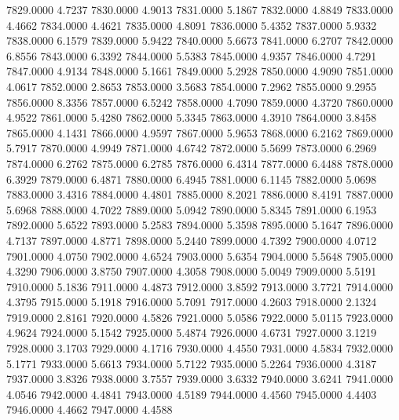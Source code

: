 7829.0000      4.7237
7830.0000      4.9013
7831.0000      5.1867
7832.0000      4.8849
7833.0000      4.4662
7834.0000      4.4621
7835.0000      4.8091
7836.0000      5.4352
7837.0000      5.9332
7838.0000      6.1579
7839.0000      5.9422
7840.0000      5.6673
7841.0000      6.2707
7842.0000      6.8556
7843.0000      6.3392
7844.0000      5.5383
7845.0000      4.9357
7846.0000      4.7291
7847.0000      4.9134
7848.0000      5.1661
7849.0000      5.2928
7850.0000      4.9090
7851.0000      4.0617
7852.0000      2.8653
7853.0000      3.5683
7854.0000      7.2962
7855.0000      9.2955
7856.0000      8.3356
7857.0000      6.5242
7858.0000      4.7090
7859.0000      4.3720
7860.0000      4.9522
7861.0000      5.4280
7862.0000      5.3345
7863.0000      4.3910
7864.0000      3.8458
7865.0000      4.1431
7866.0000      4.9597
7867.0000      5.9653
7868.0000      6.2162
7869.0000      5.7917
7870.0000      4.9949
7871.0000      4.6742
7872.0000      5.5699
7873.0000      6.2969
7874.0000      6.2762
7875.0000      6.2785
7876.0000      6.4314
7877.0000      6.4488
7878.0000      6.3929
7879.0000      6.4871
7880.0000      6.4945
7881.0000      6.1145
7882.0000      5.0698
7883.0000      3.4316
7884.0000      4.4801
7885.0000      8.2021
7886.0000      8.4191
7887.0000      5.6968
7888.0000      4.7022
7889.0000      5.0942
7890.0000      5.8345
7891.0000      6.1953
7892.0000      5.6522
7893.0000      5.2583
7894.0000      5.3598
7895.0000      5.1647
7896.0000      4.7137
7897.0000      4.8771
7898.0000      5.2440
7899.0000      4.7392
7900.0000      4.0712
7901.0000      4.0750
7902.0000      4.6524
7903.0000      5.6354
7904.0000      5.5648
7905.0000      4.3290
7906.0000      3.8750
7907.0000      4.3058
7908.0000      5.0049
7909.0000      5.5191
7910.0000      5.1836
7911.0000      4.4873
7912.0000      3.8592
7913.0000      3.7721
7914.0000      4.3795
7915.0000      5.1918
7916.0000      5.7091
7917.0000      4.2603
7918.0000      2.1324
7919.0000      2.8161
7920.0000      4.5826
7921.0000      5.0586
7922.0000      5.0115
7923.0000      4.9624
7924.0000      5.1542
7925.0000      5.4874
7926.0000      4.6731
7927.0000      3.1219
7928.0000      3.1703
7929.0000      4.1716
7930.0000      4.4550
7931.0000      4.5834
7932.0000      5.1771
7933.0000      5.6613
7934.0000      5.7122
7935.0000      5.2264
7936.0000      4.3187
7937.0000      3.8326
7938.0000      3.7557
7939.0000      3.6332
7940.0000      3.6241
7941.0000      4.0546
7942.0000      4.4841
7943.0000      4.5189
7944.0000      4.4560
7945.0000      4.4403
7946.0000      4.4662
7947.0000      4.4588

